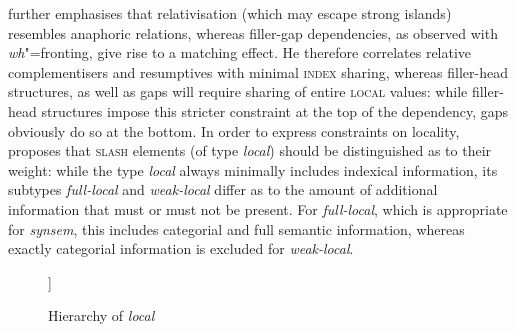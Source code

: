 \documentclass[output=paper
,notxmath 
	        ,collection
	        ,collectionchapter
 	        ,biblatex
                ,babelshorthands
                ,newtxmath
                ,draftmode
                ,colorlinks, citecolor=brown
]{langscibook}
\begin{document}
\noindent
\citet{Crysmann2012b-u} further emphasises that relativisation (which
may escape strong islands) resembles anaphoric relations, whereas
filler-gap dependencies, as observed with \emph{wh}"=fronting, give
rise to a matching effect. He therefore correlates relative
complementisers and resumptives with minimal \textsc{index} sharing,
whereas filler-head structures, as well as gaps will require sharing
of entire \textsc{local} values: while filler-head structures impose
this stricter constraint at the top of the dependency, gaps obviously
do so at the bottom. In order to express constraints on locality,
\citet{Crysmann:12,Crysmann:16} proposes that \textsc{slash} elements
(of type \textit{local}) should be distinguished as to their weight:
while the type \textit{local} always minimally includes indexical
information, its subtypes \textit{full-local} and \textit{weak-local}
differ as to the amount of additional information that must or must
not be present. For \textit{full-local}, which is appropriate for
\textit{synsem}, this includes categorial and full semantic
information, whereas exactly categorial information is excluded for
\textit{weak-local}.



%  
%
%
%
%



\begin{figure}
	\centering

\begin{forest}
[%
\avm{
	[\type*{local} 
	cont &	[index & ind ] ]
}%
	[%
	\avm{
		[\type*{full-local}
		cat & cat ]
	}]
	[%
	\avm{
		[\type*{weak-local}
		cont &	[rels <  > ] ]
	}]
]
\end{forest}  
  
\caption{\label{fig:local}Hierarchy of \textit{local} \citep[]{Crysmann:16}}
  
\end{figure}
\end{document}
